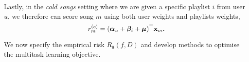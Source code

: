 Lastly, %
in the \emph{cold songs} setting where we are given a specific playlist $i$ from user $u$,
we therefore can score song $m$ using both user weights and playlists weights, \ie
\vspace{-.3em}
\begin{equation}
\label{eq:cs}
r_m^{(c)} = ({\bm{\alpha}}_u + {\bm{\beta}}_i + \bm{\mu})^\top \mathbf{x}_m.
\end{equation}




We now specify the empirical risk $R_{\uptheta}(f, D)$ %
and develop methods to optimise the multitask learning objective.




